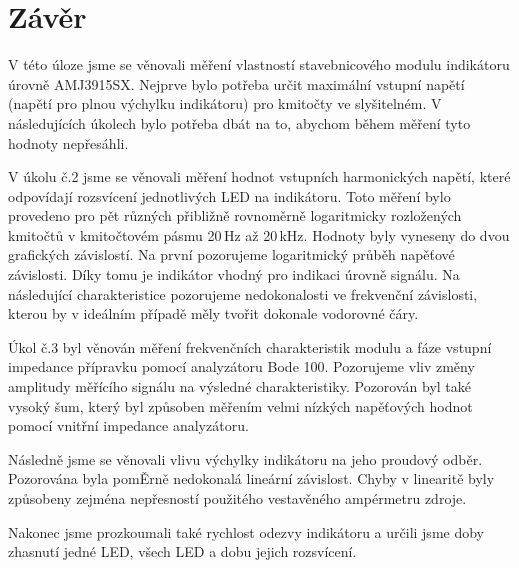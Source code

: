 \documentclass[a4paper, czech]{article}
\begin{document}
\section{Závěr}

V této úloze jsme se věnovali měření vlastností stavebnicového modulu indikátoru úrovně AMJ3915SX.
Nejprve bylo potřeba určit maximální vstupní napětí (napětí pro plnou výchylku indikátoru) pro kmitočty ve slyšitelném.
V následujících úkolech bylo potřeba dbát na to, abychom během měření tyto hodnoty nepřesáhli.

V úkolu č.2 jsme se věnovali měření hodnot vstupních harmonických napětí, které odpovídají rozsvícení jednotlivých LED na indikátoru.
Toto měření bylo provedeno pro pět různých přibližně rovnoměrně logaritmicky rozložených kmitočtů v kmitočtovém pásmu 20\,Hz až 20\,kHz.
Hodnoty byly vyneseny do dvou grafických závislostí.
Na první pozorujeme logaritmický průběh napěťové závislosti.
Díky tomu je indikátor vhodný pro indikaci úrovně signálu.
Na následující charakteristice pozorujeme nedokonalosti ve frekvenční závislosti, kterou by v ideálním případě měly tvořit dokonale vodorovné čáry.

Úkol č.3 byl věnován měření frekvenčních charakteristik modulu a fáze vstupní impedance přípravku pomocí analyzátoru Bode 100.
Pozorujeme vliv změny amplitudy měřícího signálu na výsledné charakteristiky.
Pozorován byl také vysoký šum, který byl způsoben měřením velmi nízkých napěťových hodnot pomocí vnitřní impedance analyzátoru.

Následně jsme se věnovali vlivu výchylky indikátoru na jeho proudový odběr.
Pozorována byla pomĚrně nedokonalá lineární závislost.
Chyby v linearitě byly způsobeny zejména nepřesností použitého vestavěného ampérmetru zdroje.

Nakonec jsme prozkoumali také rychlost odezvy indikátoru a určili jsme doby zhasnutí jedné LED, všech LED a dobu jejich rozsvícení.
\end{document}
